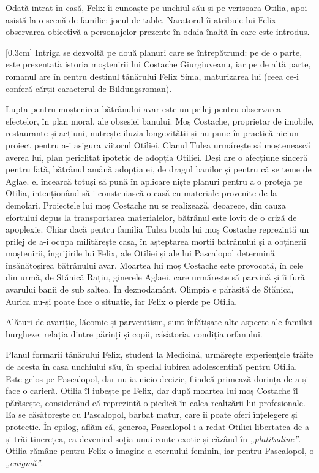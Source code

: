 \documentclass[
12pt,
a4paper
]{article}
\begin{document}
Odată intrat în casă, Felix îi cunoaște pe unchiul său și pe verișoara Otilia, apoi asistă la o scenă de familie: jocul de table. Naratorul îi atribuie lui Felix observarea obiectivă a personajelor prezente în odaia înaltă în care este introdus.

[0.3cm]
Intriga se dezvoltă pe două planuri care se întrepătrund: pe de o parte, este prezentată istoria moștenirii lui Costache Giurgiuveanu, iar pe de altă parte, romanul are în centru destinul tânărului Felix Sima, maturizarea lui (ceea ce-i conferă cărții caracterul de Bildungsroman).

Lupta pentru moștenirea bătrânului avar este un prilej pentru observarea efectelor, în plan moral, ale obsesiei banului. Moș Costache, proprietar de imobile, restaurante și acțiuni, nutrește iluzia longevității și nu pune în practică niciun proiect pentru a-i asigura viitorul Otiliei. Clanul Tulea urmărește să moștenească averea lui, plan periclitat ipotetic de adopția Otiliei. Deși are o afecțiune sinceră pentru fată, bătrânul amână adopția ei, de dragul banilor și pentru că se teme de Aglae. el încearcă totuși să pună în aplicare niște planuri pentru a o proteja pe Otilia, intenționând să-i construiască o casă cu materiale provenite de la demolări. Proiectele lui moș Costache nu se realizează, deoarece, din cauza efortului depus la transportarea materialelor, bătrânul este lovit de o criză de apoplexie. Chiar dacă pentru familia Tulea boala lui moș Costache reprezintă un prilej de a-i ocupa militărește casa, în așteptarea morții bătrânului și a obținerii moștenirii, îngrijirile lui Felix, ale Otiliei și ale lui Pascalopol determină însănătoșirea bătrânului avar. Moartea lui moș Costache este provocată, în cele din urmă, de Stănică Rațiu, ginerele Aglaei, care urmărește să parvină și îi fură avarului banii de sub saltea. În deznodământ, Olimpia e părăsită de Stănică, Aurica nu-și poate face o situație, iar Felix o pierde pe Otilia.

Alături de avariție, lăcomie și parvenitism, sunt înfățișate alte aspecte ale familiei burgheze: relația dintre părinți și copii, căsătoria, condiția orfanului.

Planul formării tânărului Felix, student la Medicină, urmărește experiențele trăite de acesta în casa unchiului său, în special iubirea adolescentină pentru Otilia. Este gelos pe Pascalopol, dar nu ia nicio decizie, fiindcă primează dorința de a-și face o carieră. Otilia îl iubește pe Felix, dar după moartea lui moș Costache îl părăsește, considerând că reprezintă o piedică în calea realizării lui profesionale. Ea se căsătorește cu Pascalopol, bărbat matur, care îi poate oferi înțelegere și protecție. În epilog, aflăm că, generos, Pascalopol i-a redat Otiliei libertatea de a-și trăi tinerețea, ea devenind soția unui conte exotic și căzând în \textit{„platitudine”}. Otilia rămâne pentru Felix o imagine a eternului feminin, iar pentru Pascalopol, o \textit{„enigmă”}.
\end{document}
